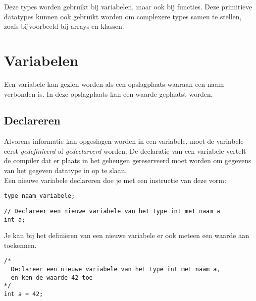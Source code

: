 \documentclass[11pt,fleqn]{book} %
\begin{document}


\noindent Deze types worden gebruikt bij variabelen, maar ook bij functies. Deze primitieve datatypes kunnen ook gebruikt worden om complexere types samen te stellen, zoals bijvoorbeeld bij arrays en klassen.

\section{Variabelen}
Een variabele kan gezien worden als een opslagplaats waaraan een naam verbonden is. In deze opslagplaats kan een waarde geplaatst worden.
\subsection{Declareren}
Alvorens informatie kan opgeslagen worden in een variabele, moet de variabele eerst \emph{gedefinieerd} of \emph{gedeclareerd} worden. De declaratie van een variabele vertelt de compiler dat er plaats in het geheugen gereserveerd moet worden om gegevens van het gegeven datatype in op te slaan.\\

\noindent Een nieuwe variabele declareren doe je met een instructie van deze vorm: 
\begin{center}
	\texttt{type naam\_variabele;}
\end{center}

\begin{example}
	\phantom{ }
	\begin{verbatim}
// Declareer een nieuwe variabele van het type int met naam a
int a;
	\end{verbatim}
\end{example}

\noindent Je kan bij het definiëren van een nieuwe variabele er ook meteen een waarde aan toekennen.

\begin{example}
	\phantom{ }
	\begin{verbatim}
/*
  Declareer een nieuwe variabele van het type int met naam a, 
  en ken de waarde 42 toe
*/
int a = 42;
	\end{verbatim}
\end{example}
\end{document}

